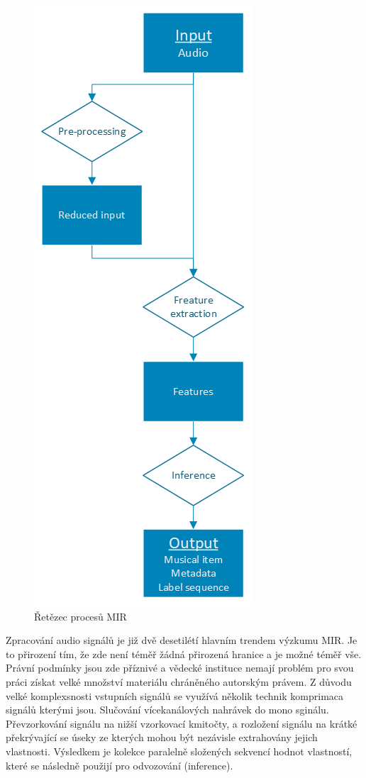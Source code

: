 \begin{figure}[H]
    \centering
    \includegraphics[width = 0.4\linewidth]{obrazky/MIR-diagram.png}
    \caption{Řetězec procesů MIR \cite{a_new_companion_to_digital_humanities}}
    \label{fig:MIR_diagram}
\end{figure}

    Zpracování audio signálů je již dvě desetilétí hlavním trendem výzkumu \acs*{MIR}.
    Je to přirození tím, že zde není téměř žádná přirozená hranice a je možné téměř vše.
    Právní podmínky jsou zde příznivé a vědecké instituce nemají problém pro svou práci získat velké množství materiálu chráněného autorským právem.
    Z důvodu velké komplexsnosti vstupních signálů se využívá několik technik komprimaca signálů kterými jsou. 
    Slučování vícekanálových nahrávek do mono sginálu. Převzorkování signálu na nižší vzorkovací kmitočty,
    a rozložení signálu na krátké překrývající se úseky ze kterých mohou být nezávisle extrahovány jejich vlastnosti. 
    Výsledkem je kolekce paralelně složených sekvencí hodnot vlastností, které se následně použijí pro odvozování (inference).

